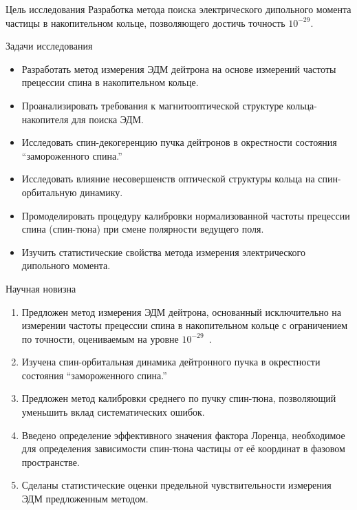 \documentclass[14pt]{beamer}
\begin{document}
\begin{frame}{Цель исследования}
Разработка метода поиска электрического дипольного момента частицы в накопительном кольце, 
позволяющего достичь точность $10^{-29}$\ecm.
\end{frame}
\begin{frame}{Задачи исследования}
	\begin{itemize}
		\item Разработать метод измерения ЭДМ дейтрона на основе измерений частоты прецессии спина в накопительном кольце.
		\item Проанализировать требования к магнитооптической структуре кольца-накопителя для поиска ЭДМ.
		\item Исследовать спин-декогеренцию пучка дейтронов в окрестности состояния ``замороженного спина.''
	\end{itemize}
\end{frame}
\begin{frame}
	\begin{itemize} 
		\item Исследовать влияние несовершенств оптической структуры кольца на спин-орбитальную динамику. 
		\item Промоделировать процедуру калибровки нормализованной частоты прецессии спина (спин-тюна) при смене полярности ведущего поля.
		\item Изучить статистические свойства метода измерения электрического дипольного момента.
	\end{itemize}
\end{frame}

\begin{frame}{Научная новизна}
	\begin{enumerate}
		\item Предложен метод измерения ЭДМ дейтрона,
		основанный исключительно на измерении частоты прецессии спина в накопительном кольце 
		с ограничением по точности, оцениваемым на уровне $10^{-29}$~\ecm.
		\item Изучена спин-орбитальная динамика дейтронного пучка в окрестности состояния ``замороженного спина.'' 
	\end{enumerate}
\end{frame}
\begin{frame}
	\begin{enumerate} \setcounter{enumi}{2}
		\item Предложен метод калибровки среднего по пучку спин-тюна, позволяющий уменьшить вклад систематических ошибок.
		\item Введено определение эффективного значения фактора Лоренца, необходимое для 
		определения зависимости спин-тюна частицы от её координат в фазовом пространстве. 
		\item Сделаны статистические оценки предельной чувствительности измерения ЭДМ предложенным методом.
	\end{enumerate}
\end{frame}
\end{document}
